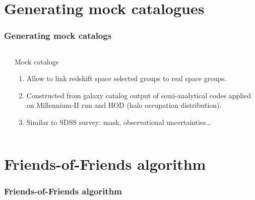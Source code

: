 \documentclass{beamer}
\begin{document}
\section{Generating mock catalogues}
\begin{frame}
    \frametitle{Generating mock catalogs}

    \begin{columns}
        \begin{column}{0.5\textwidth}
        \end{column}
        \begin{column}{0.5\textwidth}
            \begin{alertblock}{Mock catalogs}
                \begin{enumerate}
                    \item<1-> Allow to link redshift space selected groups
                        to real space groups.
                    \item<2-> Constructed from galaxy catalog output of
                        semi-analytical codes applied on Millennium-II run
                        and HOD (halo occupation distribution).
                    \item<3-> Similar to SDSS survey: mask, observational
                        uncertainties\ldots
                \end{enumerate}
            \end{alertblock}
        \end{column}
    \end{columns}
\end{frame}

\section{Friends-of-Friends algorithm}
\begin{frame}

    \frametitle{Friends-of-Friends algorithm}

    \begin{columns}
        \begin{column}{0.65\textwidth}
        \end{column}
        \begin{column}{0.35\textwidth}
            \only<1>{%
            }
            \only<2>{%
            }
        \end{column}
    \end{columns}
\end{frame}
\end{document}
